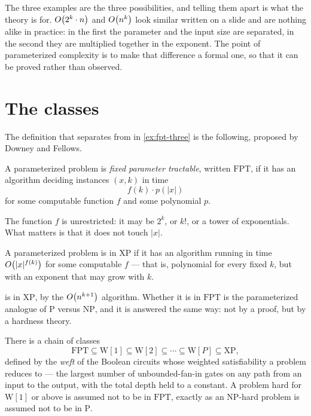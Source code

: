 \begin{intuition}
The three examples are the three possibilities, and telling them apart is what
the theory is for. $O\!\left(2^k \cdot n\right)$ and $O\!\left(n^k\right)$ look similar written
on a slide and are nothing alike in practice: in the first the parameter and the
input size are separated, in the second they are multiplied together in the
exponent. The point of parameterized complexity is to make that difference a
formal one, so that it can be proved rather than observed.
\end{intuition}

\section{The classes}
\label{sec:fpt-classes}

The definition that separates  from  in
\cref{ex:fpt-three} is the following, proposed by Downey and Fellows.

\begin{definition}[FPT]\label{def:fpt}
A parameterized problem is \emph{fixed parameter tractable}, written
$\mathrm{FPT}$, if it has an algorithm deciding instances $(x,k)$ in time
\[ f(k) \cdot p(|x|) \]
for some computable function $f$ and some polynomial $p$.
\end{definition}

The function $f$ is unrestricted: it may be $2^k$, or $k!$, or a tower of
exponentials. What matters is that it does not touch $|x|$.

\begin{definition}[XP]\label{def:xp}
A parameterized problem is in $\mathrm{XP}$ if it has an algorithm running in
time $O\!\left(|x|^{f(k)}\right)$ for some computable $f$ --- that is, polynomial for
every fixed $k$, but with an exponent that may grow with $k$.
\end{definition}

 is in $\mathrm{XP}$, by the $O\!\left(n^{k+1}\right)$ algorithm. Whether
it is in $\mathrm{FPT}$ is the parameterized analogue of
$\mathrm{P}$ versus $\mathrm{NP}$, and it is answered the same way: not by a
proof, but by a hardness theory.

\begin{definition}\label{def:w-hierarchy}
There is a chain of classes
\[ \mathrm{FPT} \subseteq \mathrm{W}[1] \subseteq \mathrm{W}[2] \subseteq
   \cdots \subseteq \mathrm{W}[P] \subseteq \mathrm{XP}, \]
defined by the \emph{weft} of the Boolean circuits whose weighted
satisfiability a problem reduces to --- the largest number of unbounded-fan-in
gates on any path from an input to the output, with the total depth held to a
constant. A problem hard for $\mathrm{W}[1]$ or above is assumed not
to be in $\mathrm{FPT}$, exactly as an \textrm{NP}-hard problem is assumed not
to be in $\mathrm{P}$.
\end{definition}

